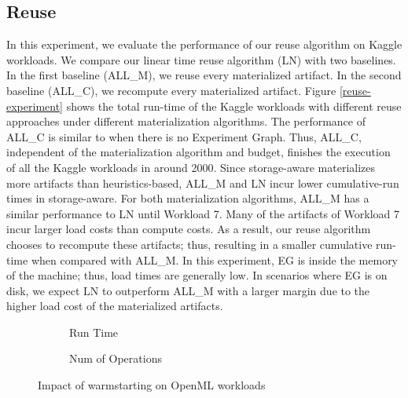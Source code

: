 \subsection{Reuse}
In this experiment, we evaluate the performance of our reuse algorithm on Kaggle workloads.
We compare our linear time reuse algorithm (LN) with two baselines.
In the first baseline (ALL\_M), we reuse every materialized artifact.
In the second baseline (ALL\_C), we recompute every materialized artifact.
Figure \ref{reuse-experiment} shows the total run-time of the Kaggle workloads with different reuse approaches under different materialization algorithms.
The performance of ALL\_C is similar to when there is no Experiment Graph.
Thus, ALL\_C, independent of the materialization algorithm and budget, finishes the execution of all the Kaggle workloads in around 2000.
Since storage-aware materializes more artifacts than heuristics-based, ALL\_M and LN incur lower cumulative-run times in storage-aware.
For both materialization algorithms, ALL\_M has a similar performance to LN until Workload 7.
Many of the artifacts of Workload 7 incur larger load costs than compute costs.
As a result, our reuse algorithm chooses to recompute these artifacts; thus, resulting in a smaller cumulative run-time when compared with ALL\_M.
In this experiment, EG is inside the memory of the machine; thus, load times are generally low.
In scenarios where EG is on disk, we expect LN to outperform ALL\_M with a larger margin due to the higher load cost of the materialized artifacts.
\begin{figure}[t]
\begin{subfigure}[b]{0.5\linewidth}
\centering
 \resizebox{\columnwidth}{!}{%
%
}
\caption{Run Time}
\end{subfigure}%
\begin{subfigure}[b]{0.5\linewidth}
\centering
 \resizebox{\columnwidth}{!}{%
%
}
\caption{Num of Operations}
\end{subfigure}
\caption{Impact of warmstarting on OpenML workloads}
\label{exp-model-warmstarting}
\vspace{-6mm}
\end{figure}
